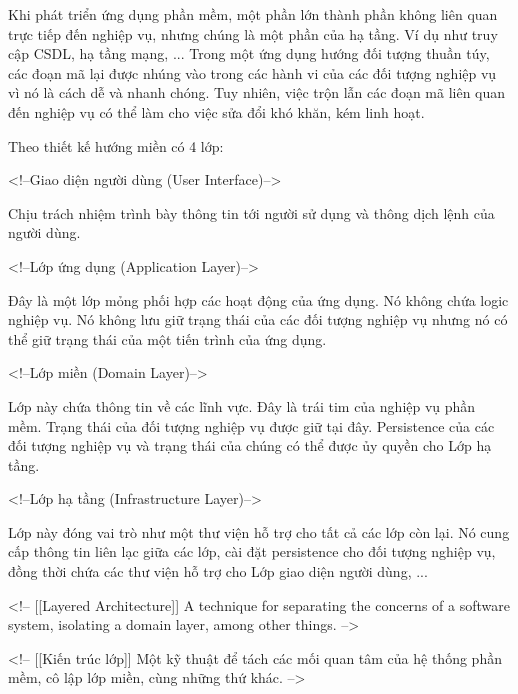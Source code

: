 

Khi phát triển ứng dụng phần mềm, một phần lớn thành phần không liên quan trực tiếp đến nghiệp vụ, nhưng chúng là một phần của hạ tầng. Ví dụ như truy cập CSDL, hạ tầng mạng, ... Trong một ứng dụng hướng đối tượng thuần túy, các đoạn mã lại được nhúng vào trong các hành vi của các đối tượng nghiệp vụ vì nó là cách dễ và nhanh chóng. Tuy nhiên, việc trộn lẫn các đoạn mã liên quan đến nghiệp vụ có thể làm cho việc sửa đổi  khó khăn, kém linh hoạt.

Theo thiết kế hướng miền có 4 lớp:

<!--Giao diện người dùng (User Interface)-->


Chịu trách nhiệm trình bày thông tin tới người sử dụng và thông dịch lệnh của người dùng.



<!--Lớp ứng dụng (Application Layer)-->

Đây là một lớp mỏng phối hợp các hoạt động của ứng dụng. Nó không chứa logic nghiệp vụ. Nó không lưu giữ trạng thái của các đối tượng nghiệp vụ nhưng nó có thể giữ trạng thái của một tiến trình của ứng dụng.



<!--Lớp miền (Domain Layer)-->

Lớp này chứa thông tin về các lĩnh vực. Đây là trái tim của nghiệp vụ phần mềm. Trạng thái của đối tượng nghiệp vụ được giữ tại đây. Persistence của các đối tượng nghiệp vụ và trạng thái của chúng có thể được ủy quyền cho Lớp hạ tầng.



<!--Lớp hạ tầng (Infrastructure Layer)-->

Lớp này đóng vai trò như một thư viện hỗ trợ cho tất cả các lớp còn lại. Nó cung cấp thông tin liên lạc giữa các lớp, cài đặt persistence cho đối tượng nghiệp vụ, đồng thời chứa các thư viện hỗ trợ cho Lớp giao diện người dùng, ...





<!-- [[Layered Architecture]] A technique for separating the concerns of a software system, isolating a domain layer, among other things. -->
 
<!-- [[Kiến trúc lớp]] Một kỹ thuật để tách các mối quan tâm của hệ thống phần mềm, cô lập lớp miền, cùng những thứ khác. -->


